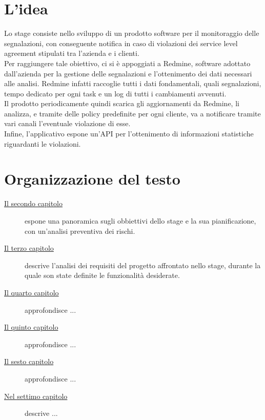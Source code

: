 \section{L'idea}

Lo stage consiste nello sviluppo di un prodotto software per il monitoraggio delle segnalazioni, con conseguente notifica in caso di violazioni dei service level agreement stipulati tra l'azienda e i clienti.\\
Per raggiungere tale obiettivo, ci si è appoggiati a Redmine, software adottato dall'azienda per la gestione delle segnalazioni e l'ottenimento dei dati necessari alle analisi. Redmine infatti raccoglie tutti i dati fondamentali, quali segnalazioni, tempo dedicato per ogni task e un log di tutti i cambiamenti avvenuti. \\
Il prodotto periodicamente quindi scarica gli aggiornamenti da Redmine, li analizza, e tramite delle policy predefinite per ogni cliente, va a notificare tramite vari canali l'eventuale violazione di esse. \\
Infine, l'applicativo espone un'API per l'ottenimento di informazioni statistiche riguardanti le violazioni. 

\section{Organizzazione del testo}

\begin{description}
    \item[{\hyperref[cap:processi-metodologie]{Il secondo capitolo}}] espone una panoramica sugli obbiettivi dello stage e la sua pianificazione, con un'analisi preventiva dei rischi.
    
    \item[{\hyperref[cap:descrizione-stage]{Il terzo capitolo}}] descrive l'analisi dei requisiti del progetto affrontato nello stage, durante la quale son state definite le funzionalità desiderate.
    
    \item[{\hyperref[cap:analisi-requisiti]{Il quarto capitolo}}] approfondisce ...
    
    \item[{\hyperref[cap:progettazione-codifica]{Il quinto capitolo}}] approfondisce ...
    
    \item[{\hyperref[cap:verifica-validazione]{Il sesto capitolo}}] approfondisce ...
    
    \item[{\hyperref[cap:conclusioni]{Nel settimo capitolo}}] descrive ...
\end{description}

